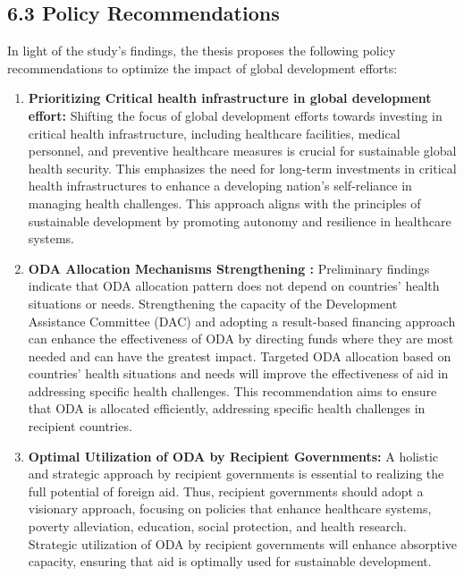 \subsection*{6.3 Policy Recommendations}
In light of the study's findings, the thesis proposes the following policy recommendations to optimize the impact of global development efforts:
\begin{enumerate}[i]
    \item \textbf{Prioritizing Critical health infrastructure in global development effort:} Shifting the focus of global development efforts towards investing in critical health infrastructure, including healthcare facilities, medical personnel, and preventive healthcare measures is crucial for sustainable global health security. This emphasizes the need for long-term investments in critical health infrastructures to enhance a developing nation's self-reliance in managing health challenges. This approach aligns with the principles of sustainable development by promoting autonomy and resilience in healthcare systems. 
   
    \item \textbf{ODA Allocation Mechanisms Strengthening :} Preliminary findings indicate that ODA allocation pattern does not depend on countries' health situations or needs. Strengthening the capacity of the Development Assistance Committee (DAC) and adopting a result-based financing approach can enhance the effectiveness of ODA by directing funds where they are most needed and can have the greatest impact. Targeted ODA allocation based on countries' health situations and needs will improve the effectiveness of aid in addressing specific health challenges. This recommendation aims to ensure that ODA is allocated efficiently, addressing specific health challenges in recipient countries.
    
    \item \textbf{Optimal  Utilization of ODA by Recipient Governments:} A holistic and strategic approach by recipient governments is essential to realizing the full potential of foreign aid. Thus, recipient governments should adopt a visionary approach, focusing on policies that enhance healthcare systems, poverty alleviation, education, social protection, and health research. Strategic utilization of ODA by recipient governments will enhance absorptive capacity, ensuring that aid is optimally used for sustainable development.  
    

\end{enumerate}
